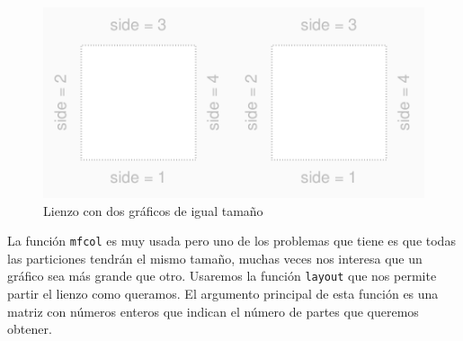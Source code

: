 \documentclass[]{article}
\begin{document}
\begin{figure}

{\centering \includegraphics{index_files/figure-latex/unnamed-chunk-4-1} 

}

\caption{Lienzo con dos gráficos de igual tamaño}\label{fig:unnamed-chunk-4}
\end{figure}

La función \texttt{mfcol} es muy usada pero uno de los problemas que
tiene es que todas las particiones tendrán el mismo tamaño, muchas veces
nos interesa que un gráfico sea más grande que otro. Usaremos la función
\texttt{layout} que nos permite partir el lienzo como queramos. El
argumento principal de esta función es una matriz con números enteros
que indican el número de partes que queremos obtener.
\end{document}
